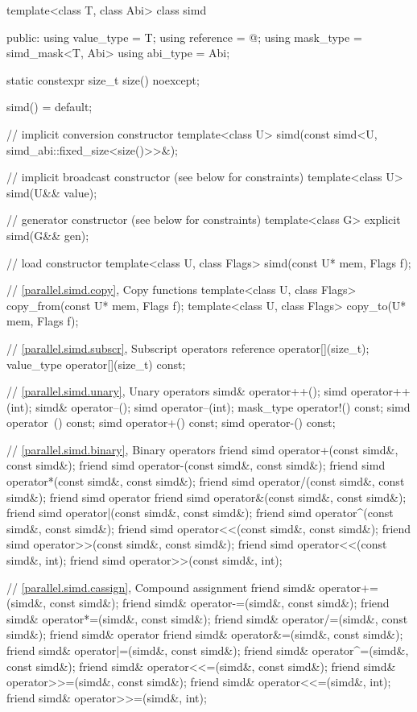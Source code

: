 \begin{codeblock}
template<class T, class Abi> class simd {
public:
  using value_type = T;
  using reference = @\seebelow@;
  using mask_type = simd_mask<T, Abi>
  using abi_type = Abi;

  static constexpr size_t size() noexcept;

  simd() = default;

  // implicit conversion constructor
  template<class U> simd(const simd<U, simd_abi::fixed_size<size()>>&);

  // implicit broadcast constructor (see below for constraints)
  template<class U> simd(U&& value);

  // generator constructor (see below for constraints)
  template<class G> explicit simd(G&& gen);

  // load constructor
  template<class U, class Flags> simd(const U* mem, Flags f);

  // \ref{parallel.simd.copy}, Copy functions
  template<class U, class Flags> copy_from(const U* mem, Flags f);
  template<class U, class Flags> copy_to(U* mem, Flags f);

  // \ref{parallel.simd.subscr}, Subscript operators
  reference operator[](size_t);
  value_type operator[](size_t) const;

  // \ref{parallel.simd.unary}, Unary operators
  simd& operator++();
  simd operator++(int);
  simd& operator--();
  simd operator--(int);
  mask_type operator!() const;
  simd operator~() const;
  simd operator+() const;
  simd operator-() const;

  // \ref{parallel.simd.binary}, Binary operators
  friend simd operator+(const simd&, const simd&);
  friend simd operator-(const simd&, const simd&);
  friend simd operator*(const simd&, const simd&);
  friend simd operator/(const simd&, const simd&);
  friend simd operator%
  friend simd operator&(const simd&, const simd&);
  friend simd operator|(const simd&, const simd&);
  friend simd operator^(const simd&, const simd&);
  friend simd operator<<(const simd&, const simd&);
  friend simd operator>>(const simd&, const simd&);
  friend simd operator<<(const simd&, int);
  friend simd operator>>(const simd&, int);

  // \ref{parallel.simd.cassign}, Compound assignment
  friend simd& operator+=(simd&, const simd&);
  friend simd& operator-=(simd&, const simd&);
  friend simd& operator*=(simd&, const simd&);
  friend simd& operator/=(simd&, const simd&);
  friend simd& operator%
  friend simd& operator&=(simd&, const simd&);
  friend simd& operator|=(simd&, const simd&);
  friend simd& operator^=(simd&, const simd&);
  friend simd& operator<<=(simd&, const simd&);
  friend simd& operator>>=(simd&, const simd&);
  friend simd& operator<<=(simd&, int);
  friend simd& operator>>=(simd&, int);

}
\end{codeblock}
